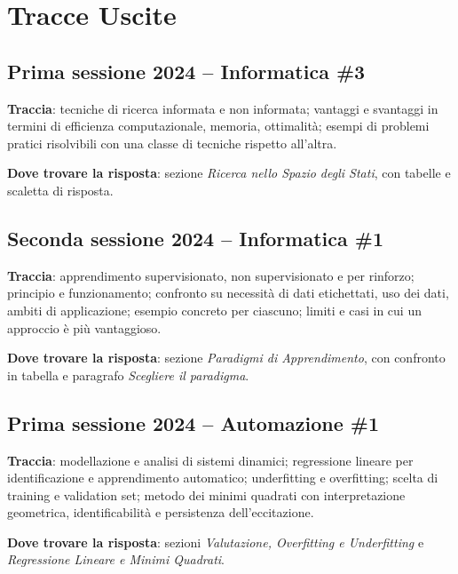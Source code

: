
\section*{Tracce Uscite} %

\subsection*{Prima sessione 2024 -- Informatica \#3}
\textbf{Traccia}: tecniche di ricerca informata e non informata; vantaggi e svantaggi in termini di efficienza computazionale, memoria, ottimalità; esempi di problemi pratici risolvibili con una classe di tecniche rispetto all'altra.

\textbf{Dove trovare la risposta}: sezione \emph{Ricerca nello Spazio degli Stati}, con tabelle e scaletta di risposta.

\subsection*{Seconda sessione 2024 -- Informatica \#1}
\textbf{Traccia}: apprendimento supervisionato, non supervisionato e per rinforzo; principio e funzionamento; confronto su necessità di dati etichettati, uso dei dati, ambiti di applicazione; esempio concreto per ciascuno; limiti e casi in cui un approccio è più vantaggioso.

\textbf{Dove trovare la risposta}: sezione \emph{Paradigmi di Apprendimento}, con confronto in tabella e paragrafo \emph{Scegliere il paradigma}.

\subsection*{Prima sessione 2024 -- Automazione \#1}
\textbf{Traccia}: modellazione e analisi di sistemi dinamici; regressione lineare per identificazione e apprendimento automatico; underfitting e overfitting; scelta di training e validation set; metodo dei minimi quadrati con interpretazione geometrica, identificabilità e persistenza dell'eccitazione.

\textbf{Dove trovare la risposta}: sezioni \emph{Valutazione, Overfitting e Underfitting} e \emph{Regressione Lineare e Minimi Quadrati}.


